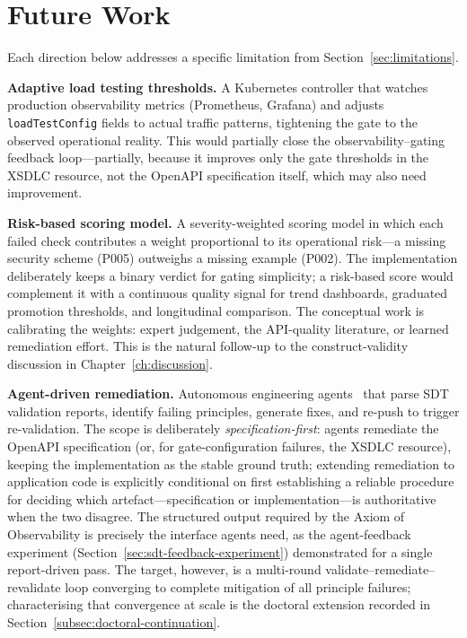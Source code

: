 \section{Future Work}
\label{sec:future-work}

Each direction below addresses a specific limitation from Section~\ref{sec:limitations}.

\textbf{Adaptive load testing thresholds.} A Kubernetes controller that watches production observability metrics (Prometheus, Grafana) and adjusts \texttt{loadTestConfig} fields to actual traffic patterns, tightening the gate to the observed operational reality. This would partially close the observability--gating feedback loop---partially, because it improves only the gate thresholds in the XSDLC resource, not the OpenAPI specification itself, which may also need improvement.

\textbf{Risk-based scoring model.} A severity-weighted scoring model in which each failed check contributes a weight proportional to its operational risk---a missing security scheme (P005) outweighs a missing example (P002). The implementation deliberately keeps a binary verdict for gating simplicity; a risk-based score would complement it with a continuous quality signal for trend dashboards, graduated promotion thresholds, and longitudinal comparison. The conceptual work is calibrating the weights: expert judgement, the API-quality literature, or learned remediation effort. This is the natural follow-up to the construct-validity discussion in Chapter~\ref{ch:discussion}.

\textbf{Agent-driven remediation.} Autonomous engineering agents~\cite{swe-agent, devin-cognition} that parse SDT validation reports, identify failing principles, generate fixes, and re-push to trigger re-validation. The scope is deliberately \emph{specification-first}: agents remediate the OpenAPI specification (or, for gate-configuration failures, the XSDLC resource), keeping the implementation as the stable ground truth; extending remediation to application code is explicitly conditional on first establishing a reliable procedure for deciding which artefact---specification or implementation---is authoritative when the two disagree. The structured output required by the Axiom of Observability is precisely the interface agents need, as the agent-feedback experiment (Section~\ref{sec:sdt-feedback-experiment}) demonstrated for a single report-driven pass. The target, however, is a multi-round validate--remediate--revalidate loop converging to complete mitigation of all principle failures; characterising that convergence at scale is the doctoral extension recorded in Section~\ref{subsec:doctoral-continuation}.

